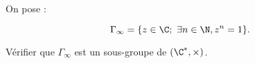 On pose :

\[ \Gamma_\infty = \{ z \in \C;\ \exists n \in \N, z^n=1 \}.\]

Vérifier que $\Gamma_\infty$ est un sous-groupe de $(\C^\ast, \times)$.